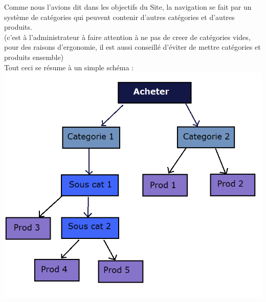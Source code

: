 Comme nous l'avions dit dans les objectifs du Site, la navigation se fait par un système de catégories qui peuvent contenir d'autres catégories et d'autres produits.\\
(c'est à l'administrateur à faire attention à ne pas de creer de catégories vides, pour des raisons d'ergonomie, il est aussi conseillé d'éviter de mettre catégories et produits ensemble)\\

Tout ceci se résume à un simple schéma :\\

\includegraphics[scale=0.5]{Images/arbocatego.png}
\newpage